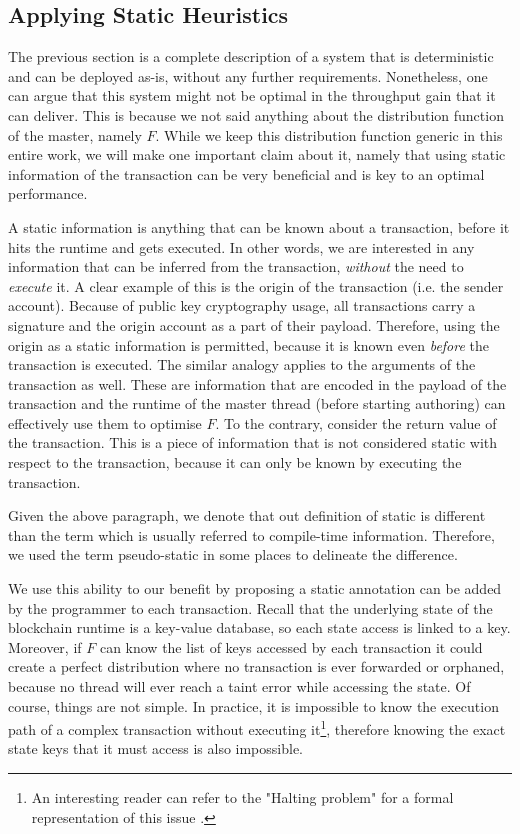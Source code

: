 \subsection{Applying Static Heuristics} \label{subsec:applying_static_hints}

The previous section is a complete description of a system that is deterministic and can be deployed
as-is, without any further requirements. Nonetheless, one can argue that this system might not be
optimal in the throughput gain that it can deliver. This is because we not said anything about the
distribution function of the master, namely $F$. While we keep this distribution function generic in
this entire work, we will make one important claim about it, namely that using static information of
the transaction can be very beneficial and is key to an optimal performance.

A static information is anything that can be known about a transaction, before it hits the runtime
and gets executed. In other words, we are interested in any information that can be inferred from
the transaction, \textit{without} the need to \textit{execute} it. A clear example of this is the
origin of the transaction (i.e. the sender account). Because of public key cryptography usage, all
transactions carry a signature and the origin account as a part of their payload. Therefore, using
the origin as a static information is permitted, because it is known even \textit{before} the
transaction is executed. The similar analogy applies to the arguments of the transaction as well.
These are information that are encoded in the payload of the transaction and the runtime of the
master thread (before starting authoring) can effectively use them to optimise $F$. To the contrary,
consider the return value of the transaction. This is a piece of information that is not considered
static with respect to the transaction, because it can only be known by executing the transaction.

\begin{remark}
	Given the above paragraph, we denote that out definition of static is different than the term
	which is usually referred to compile-time information. Therefore, we used the term pseudo-static
	in some places to delineate the difference.
\end{remark}

We use this ability to our benefit by proposing a static annotation can be added by the programmer
to each transaction. Recall that the underlying state of the blockchain runtime is a key-value
database, so each state access is linked to a key. Moreover, if $F$ can know the list of keys
accessed by each transaction it could create a perfect distribution where no transaction is ever
forwarded or orphaned, because no thread will ever reach a taint error while accessing the state. Of
course, things are not simple. In practice, it is impossible to know the execution path of a complex
transaction without executing it\footnote{An interesting reader can refer to the "Halting problem"
for a formal representation of this issue \cite{burkholderHaltingProblem1987}.}, therefore knowing
the exact state keys that it must access is also impossible.

